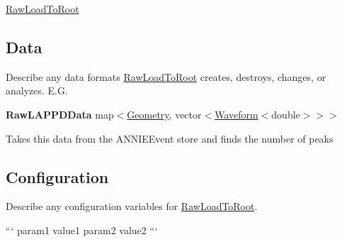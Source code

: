 \hyperlink{classRawLoadToRoot}{Raw\-Load\-To\-Root}

\subsection*{Data}

Describe any data formats \hyperlink{classRawLoadToRoot}{Raw\-Load\-To\-Root} creates, destroys, changes, or analyzes. E.\-G.

{\bfseries Raw\-L\-A\-P\-P\-D\-Data} {\ttfamily map$<$\hyperlink{classGeometry}{Geometry}, vector$<$\hyperlink{classWaveform}{Waveform}$<$double$>$$>$$>$}
\begin{DoxyItemize}
\item Takes this data from the {\ttfamily A\-N\-N\-I\-E\-Event} store and finds the number of peaks
\end{DoxyItemize}

\subsection*{Configuration}

Describe any configuration variables for \hyperlink{classRawLoadToRoot}{Raw\-Load\-To\-Root}.

``` param1 value1 param2 value2 ``` 